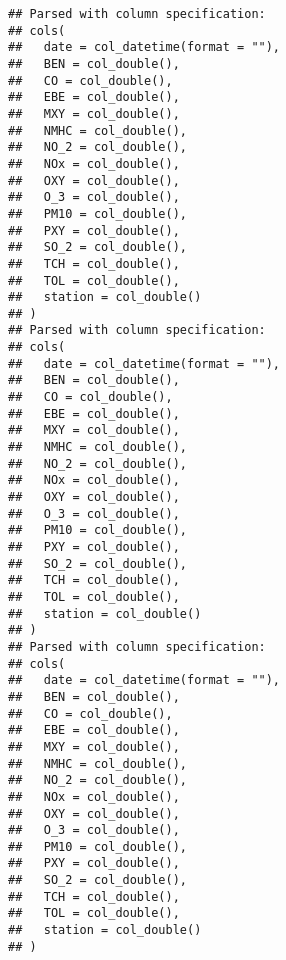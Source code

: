 \documentclass[
]{article}
\newenvironment{Shaded}{\begin{snugshade}}{\end{snugshade}}
\newcommand{\CommentTok}[1]{\textcolor[rgb]{0.56,0.35,0.01}{\textit{#1}}}
\newcommand{\DataTypeTok}[1]{\textcolor[rgb]{0.13,0.29,0.53}{#1}}
\newcommand{\KeywordTok}[1]{\textcolor[rgb]{0.13,0.29,0.53}{\textbf{#1}}}
\newcommand{\NormalTok}[1]{#1}
\newcommand{\OperatorTok}[1]{\textcolor[rgb]{0.81,0.36,0.00}{\textbf{#1}}}
\newcommand{\OtherTok}[1]{\textcolor[rgb]{0.56,0.35,0.01}{#1}}
\newcommand{\StringTok}[1]{\textcolor[rgb]{0.31,0.60,0.02}{#1}}
\begin{document}
\begin{Shaded}
\end{Shaded}

\begin{verbatim}
## Parsed with column specification:
## cols(
##   date = col_datetime(format = ""),
##   BEN = col_double(),
##   CO = col_double(),
##   EBE = col_double(),
##   MXY = col_double(),
##   NMHC = col_double(),
##   NO_2 = col_double(),
##   NOx = col_double(),
##   OXY = col_double(),
##   O_3 = col_double(),
##   PM10 = col_double(),
##   PXY = col_double(),
##   SO_2 = col_double(),
##   TCH = col_double(),
##   TOL = col_double(),
##   station = col_double()
## )
## Parsed with column specification:
## cols(
##   date = col_datetime(format = ""),
##   BEN = col_double(),
##   CO = col_double(),
##   EBE = col_double(),
##   MXY = col_double(),
##   NMHC = col_double(),
##   NO_2 = col_double(),
##   NOx = col_double(),
##   OXY = col_double(),
##   O_3 = col_double(),
##   PM10 = col_double(),
##   PXY = col_double(),
##   SO_2 = col_double(),
##   TCH = col_double(),
##   TOL = col_double(),
##   station = col_double()
## )
## Parsed with column specification:
## cols(
##   date = col_datetime(format = ""),
##   BEN = col_double(),
##   CO = col_double(),
##   EBE = col_double(),
##   MXY = col_double(),
##   NMHC = col_double(),
##   NO_2 = col_double(),
##   NOx = col_double(),
##   OXY = col_double(),
##   O_3 = col_double(),
##   PM10 = col_double(),
##   PXY = col_double(),
##   SO_2 = col_double(),
##   TCH = col_double(),
##   TOL = col_double(),
##   station = col_double()
## )
\end{verbatim}
\end{document}
